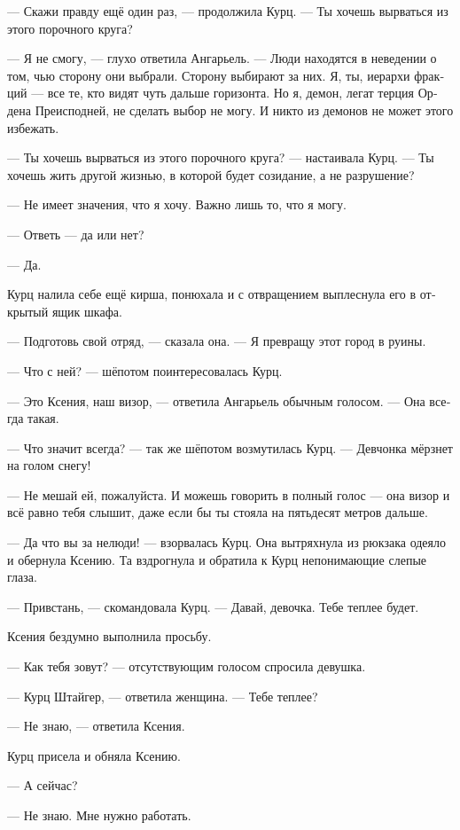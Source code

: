 \documentclass[a4paper,12pt,fleqn]{book}\usepackage{cooltooltips}\usepackage{polyglossia}\setdefaultlanguage[babelshorthands=true]{russian}\setotherlanguage{english}\defaultfontfeatures{Ligatures=TeX,Mapping=tex-text} \usepackage{xcolor}\definecolor{lightgray}{HTML}{bbbbbb}\color{lightgray}\newcommand{\ml}[3]{\textenglish{\textcolor{black}{#3}}}
\newcommand{\asterism}{\vspace{1em}{\centering\Large\bfseries$\ast~\ast~\ast$\par}\vspace{1em}}
\begin{document}
--- Скажи правду ещё один раз, --- продолжила Курц.
--- Ты хочешь вырваться из этого порочного круга?

--- Я не смогу, --- глухо ответила Ангарьель.
--- Люди находятся в неведении о том, чью сторону они выбрали.
Сторону выбирают за них.
Я, ты, иерархи фракций --- все те, кто видят чуть дальше горизонта.
Но я, демон, легат терция Ордена Преисподней, не сделать выбор не могу.
И никто из демонов не может этого избежать.

--- Ты хочешь вырваться из этого порочного круга? --- настаивала Курц.
--- Ты хочешь жить другой жизнью, в которой будет созидание, а не разрушение?

--- Не имеет значения, что я хочу.
Важно лишь то, что я могу.

--- Ответь --- да или нет?

--- Да.

Курц налила себе ещё кирша, понюхала и с отвращением выплеснула его в открытый ящик шкафа.

--- Подготовь свой отряд, --- сказала она.
--- Я превращу этот город в руины.

\asterism

--- Что с ней? --- шёпотом поинтересовалась Курц.

--- Это Ксения, наш визор, --- ответила Ангарьель обычным голосом.
--- Она всегда такая.

--- Что значит всегда? --- так же шёпотом возмутилась Курц.
--- Девчонка мёрзнет на голом снегу!

--- Не мешай ей, пожалуйста.
И можешь говорить в полный голос --- она визор и всё равно тебя слышит, даже если бы ты стояла на пятьдесят метров дальше.

--- Да что вы за нелюди! --- взорвалась Курц.
Она вытряхнула из рюкзака одеяло и обернула Ксению.
Та вздрогнула и обратила к Курц непонимающие слепые глаза.

--- Привстань, --- скомандовала Курц.
--- Давай, девочка.
Тебе теплее будет.

Ксения бездумно выполнила просьбу.

--- Как тебя зовут? --- отсутствующим голосом спросила девушка.

--- Курц Штайгер, --- ответила женщина.
--- Тебе теплее?

--- Не знаю, --- ответила Ксения.

Курц присела и обняла Ксению.

--- А сейчас?

--- Не знаю.
Мне нужно работать.
\end{document}
